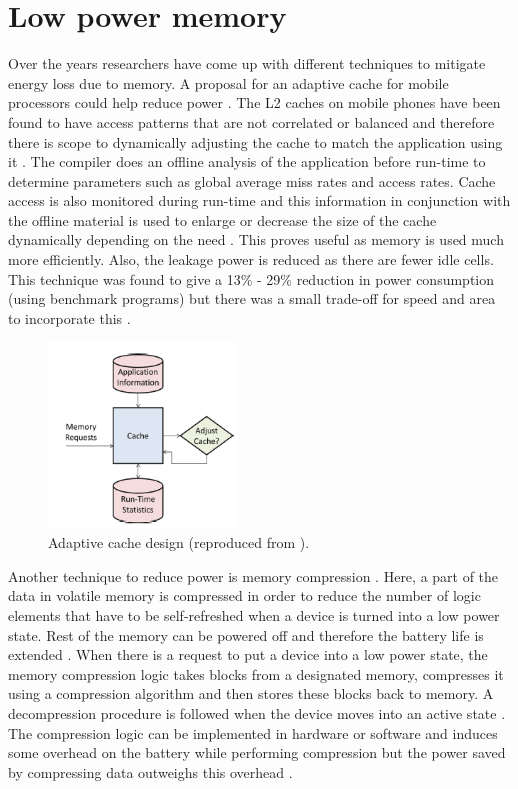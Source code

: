 \documentclass[journal]{IEEEtran}
\begin{document}
\section{Low power memory}
Over the years researchers have come up with different techniques to mitigate energy loss due to memory. A proposal for an adaptive cache for mobile processors could help reduce power \cite{Mem-Cache}. The L2 caches on mobile phones have been found to have access patterns that are not correlated or balanced and therefore there is scope to dynamically adjusting the cache to match the application using it \cite{Mem-Cache}. The compiler does an offline analysis of the application before run-time to determine parameters such as global average miss rates and access rates. Cache access is also monitored during run-time and this information in conjunction with the offline material is used to enlarge or decrease the size of the cache dynamically depending on the need \cite{Mem-Cache}. This proves useful as memory is used much more efficiently. Also, the leakage power is reduced as there are fewer idle cells. This technique was found to give a 13\% - 29\% reduction in power consumption (using benchmark programs) but there was a small trade-off for speed and area to incorporate this \cite{Mem-Cache}.\\

	\begin{figure}[h]
	   \centering
	   \includegraphics[width = 5cm]{AdaptiveCache}
	   \caption{Adaptive cache design (reproduced from \cite{Mem-Cache}).}
	   \label{Figure:Mem-Cache}
	\end{figure}	
	\FloatBarrier

Another technique to reduce power is memory compression \cite{MemComp}. Here, a part of the data in volatile memory is compressed in order to reduce the number of logic elements that have to be self-refreshed when a device is turned into a low power state. Rest of the memory can be powered off and therefore the battery life is extended \cite{MemComp}. When there is a request to put a device into a low power state, the memory compression logic takes blocks from a designated memory, compresses it using a compression algorithm and then stores these blocks back to memory. A decompression procedure is followed when the device moves into an active state \cite{MemComp}. The compression logic can be implemented in hardware or software and induces some overhead on the battery while performing compression but the power saved by compressing data outweighs this overhead \cite{MemComp}.\\
\end{document}
